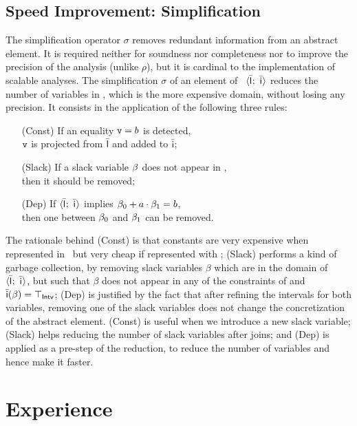 \documentclass[sttt]{svjour}
\begin{document}

\subsection{Speed Improvement: Simplification} 
The simplification operator $\sigma$ removes redundant information from an abstract element. 
It is required neither for soundness nor completeness nor to improve the precision of the analysis (unlike $\rho$), but it is cardinal to the implementation of scalable analyses.
The simplification $\sigma$ of an element of \Subpoly\ $\langle \bar{\mathsf{\mathsf{l}}}_{}^{};\ \bar{\mathsf{\mathsf{i}}}_{}^{} \rangle$ reduces the number of variables in , which is the more expensive domain, without losing any precision.
It consists in the application of the following three rules:

\begin{enumerate}
\setlength{\itemindent}{25pt}
\item[(Const)]  If an equality $\mathtt{v} = b$ is detected, \\
  $\mathtt{v}$ is projected from $\bar{\mathsf{\mathsf{l}}}$ and added to $\bar{\mathsf{\mathsf{i}}}$; 
\item[(Slack)]  If a slack variable $\beta_{}$ does not appear in \subpolyPair{}{}, \\
  then it should be removed; 
\item[(Dep)]  If $\langle \bar{\mathsf{\mathsf{l}}}_{}^{};\ \bar{\mathsf{\mathsf{i}}}_{}^{} \rangle$ implies  $\beta_{0} + a \cdot \beta_{1} = b$, \\
  then one between  $\beta_{0}$ and $\beta_{1}$ can be removed.
\end{enumerate}


\noindent The rationale behind (Const) is that constants are very expensive when represented in \Karr\ but very cheap if represented with \Intervals;
(Slack) performs a kind of garbage collection, by removing slack variables $\beta$ which are in the domain of  $\langle \bar{\mathsf{\mathsf{l}}}_{}^{};\ \bar{\mathsf{\mathsf{i}}}_{}^{} \rangle$, but such that $\beta$ does not appear in any of the constraints of  and $\bar{\mathsf{\mathsf{i}}}(\beta) = \top_{\mathsf{Intv}}$; (Dep) is justified by the fact that after refining the intervals for both variables, removing one of the slack variables does not change the concretization of the abstract element.
(Const) is useful when we introduce a new slack variable; (Slack) helps reducing the number of slack variables after joins; and (Dep) is applied as a pre-step of the reduction, to reduce the number of variables and hence make it faster.

\section{Experience}
\label{sect:Experience}
\end{document}
